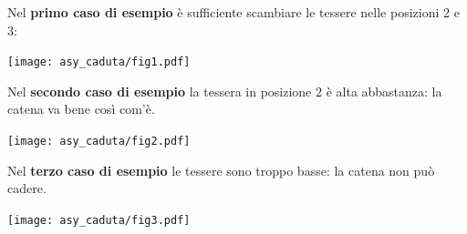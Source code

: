 

\Examples

\begin{example}
%
%
%
\end{example}


\pagebreak
\Explanation

Nel \textbf{primo caso di esempio} è sufficiente scambiare le tessere nelle posizioni $2$ e $3$:

\begin{center}
	\texttt{[image: asy\_caduta/fig1.pdf]}
\end{center}

Nel \textbf{secondo caso di esempio} la tessera in posizione $2$ è alta abbastanza: la catena va bene così com'è.

\begin{center}
	\texttt{[image: asy\_caduta/fig2.pdf]}
\end{center}

Nel \textbf{terzo caso di esempio} le tessere sono troppo basse: la catena non può cadere.

\begin{center}
	\texttt{[image: asy\_caduta/fig3.pdf]}
\end{center}
